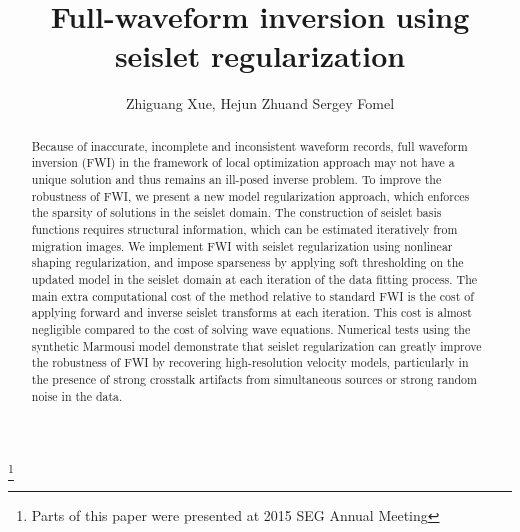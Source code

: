
\title{Full-waveform inversion using seislet regularization}
\author{Zhiguang Xue\footnotemark[1], Hejun Zhu\footnotemark[2] and Sergey Fomel\footnotemark[1]}
\maketitle

\address{
\footnotemark[1]Bureau of Economic Geology \\
John A. and Katherine G. Jackson School of Geosciences \\
The University of Texas at Austin \\
University Station, Box X \\
Austin, TX 78713-8924 \\
\footnotemark[2]Department of Geosciences \\
School of Natural Sciences and Mathematics \\
The University of Texas at Dallas \\
Richardson, Texas 75080-3021 
}

\footnote{Parts of this paper were presented at 2015 SEG Annual Meeting}


\begin{abstract}
	Because of inaccurate, incomplete and inconsistent waveform records, full waveform inversion (FWI) in the framework of local optimization approach may not have a unique solution and thus remains an ill-posed inverse problem.
	To improve the robustness of FWI, we present a new model regularization approach, which enforces the sparsity of solutions in the seislet domain.
	The construction of seislet basis functions requires structural information, which can be estimated iteratively from migration images.
	We implement FWI with seislet regularization using nonlinear shaping regularization, and impose sparseness by applying soft thresholding on the updated model in the seislet domain at each iteration of the data fitting process.
	The main extra computational cost of the method relative to standard FWI is the cost of applying forward and inverse seislet transforms at each iteration.
	This cost is almost negligible compared to the cost of solving wave equations.
	Numerical tests using the synthetic Marmousi model demonstrate that seislet regularization can greatly improve the robustness of FWI by recovering
	high-resolution velocity models, particularly in the presence of strong crosstalk artifacts from simultaneous sources or strong random noise in the data.
\end{abstract}


